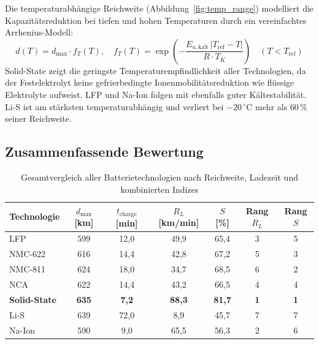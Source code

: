 ﻿\documentclass[12pt,a4paper]{article}
\begin{document}
	Die temperaturabhängige Reichweite (Abbildung~\ref{fig:temp_range})
	modelliert die Kapazitätsreduktion bei tiefen und hohen Temperaturen
	durch ein vereinfachtes Arrhenius-Modell:
	\begin{equation}
		d(T) = d_{\mathrm{max}} \cdot f_T(T),\quad
		f_T(T) = \exp\!\left(-\frac{E_{a,\mathrm{kalt}} \,|T_{\mathrm{ref}}-T|}{R \cdot T_K}\right)
		\quad (T < T_{\mathrm{ref}})
		\label{eq:temp_range}
	\end{equation}
	Solid-State zeigt die geringste Temperaturempfindlichkeit aller
	Technologien, da der Festelektrolyt keine gefrierbedingte
	Ionenmobilitätsreduktion wie flüssige Elektrolyte aufweist. LFP
	und Na-Ion folgen mit ebenfalls guter Kältestabilität. Li-S
	ist am stärksten temperaturabhängig und verliert bei
	$-20\,^\circ\mathrm{C}$ mehr als $60\,\%$ seiner Reichweite.

	\subsection{Zusammenfassende Bewertung}

	\begin{table}[H]
		\centering
		\caption{Gesamtvergleich aller Batterietechnologien nach Reichweite,
		         Ladezeit und kombinierten Indizes}
		\label{tab:summary_tech}
		\begin{tabular}{lcccccc}
			\toprule
			\textbf{Technologie} &
			$d_{\mathrm{max}}$ [km] &
			$t_{\mathrm{charge}}$ [min] &
			$R_L$ [km/min] &
			$S$ [\%] &
			Rang $R_L$ &
			Rang $S$ \\
			\midrule
			LFP         & 599  & 12{,}0 & 49{,}9 & 65{,}4 & 3 & 5 \\
			NMC-622     & 616  & 14{,}4 & 42{,}8 & 67{,}2 & 5 & 3 \\
			NMC-811     & 624  & 18{,}0 & 34{,}7 & 68{,}5 & 6 & 2 \\
			NCA         & 622  & 14{,}4 & 43{,}2 & 66{,}5 & 4 & 4 \\
			\textbf{Solid-State} & \textbf{635} & \textbf{7{,}2} &
			\textbf{88{,}3} & \textbf{81{,}7} & \textbf{1} & \textbf{1} \\
			Li-S        & 639  & 72{,}0 & \phantom{0}8{,}9 & 45{,}7 & 7 & 7 \\
			Na-Ion      & 590  & \phantom{0}9{,}0 & 65{,}5 & 56{,}3 & 2 & 6 \\
			\bottomrule
		\end{tabular}
	\end{table}
\end{document}
